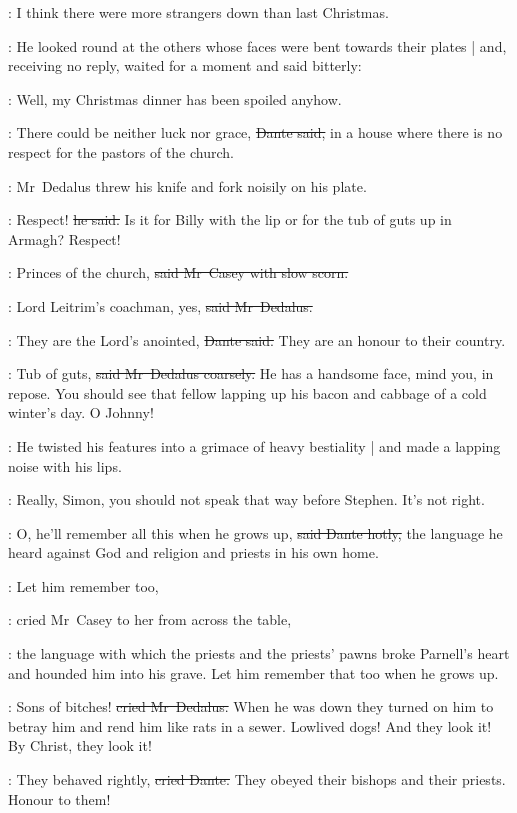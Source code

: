 \simon:
I think there were more strangers down than last Christmas.

:
He looked round at the others
whose faces were bent towards their plates |
and, receiving no reply,
waited for a moment and said bitterly:

\simon:
Well, my Christmas dinner has been spoiled anyhow.

\dante:
There could be neither luck nor grace,
\sout{Dante said,}
in a house where there is no respect for the pastors of the church.

:
Mr~Dedalus threw his knife and fork noisily on his plate.

\simon:
Respect!
\sout{he said.}
Is it for Billy with the lip
or for the tub of guts up in Armagh?
Respect!

\casey:
Princes of the church,
\sout{said Mr~Casey with slow scorn.}

\simon:
Lord Leitrim’s coachman,
yes,
\sout{said Mr~Dedalus.}

\dante:
They are the Lord’s anointed,
\sout{Dante said.}
They are an honour to their country.

\simon:
Tub of guts,
\sout{said Mr~Dedalus coarsely.}
He has a handsome face,
mind you,
in repose.
You should see that fellow
lapping up his bacon and cabbage
of a cold winter’s day.
O Johnny!

:
He twisted his features
into a grimace of heavy bestiality |
and made a lapping noise with his lips.

\marydedalus:
Really, Simon,
you should not speak that way before Stephen.
It’s not right.

\dante:
O, he’ll remember all this when he grows up,
\sout{said Dante hotly,}
the language he heard against God and religion and priests
in his own home.

\casey:
Let him remember too,

:
cried Mr~Casey to her from across the table,

\casey:
the language with which the priests
and the priests’ pawns
broke Parnell’s heart
and hounded him into his grave.
Let him remember that too when he grows up.

\simon:
Sons of bitches!
\sout{cried Mr~Dedalus.}
When he was down
they turned on him
to betray him and rend him like rats in a sewer.
Lowlived dogs!
And they look it!
By Christ, they look it!

\dante:
They behaved rightly,
\sout{cried Dante.}
They obeyed their bishops and their priests.
Honour to them!

